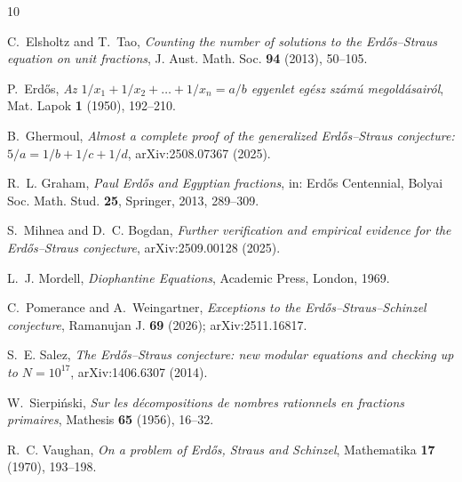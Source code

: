 \documentclass[11pt]{amsart}
\theoremstyle{remark}
\theoremstyle{definition}
\begin{document}
\begin{thebibliography}{10}

C.~Elsholtz and T.~Tao,
\emph{Counting the number of solutions to the Erd\H{o}s--Straus equation
on unit fractions},
J. Aust. Math. Soc. \textbf{94} (2013), 50--105.

P.~Erd\H{o}s,
\emph{Az $1/x_1 + 1/x_2 + \dots + 1/x_n = a/b$ egyenlet eg\'esz sz\'am\'u
megold\'asair\'ol},
Mat. Lapok \textbf{1} (1950), 192--210.

B.~Ghermoul,
\emph{Almost a complete proof of the generalized Erd\H{o}s--Straus
conjecture: $5/a = 1/b + 1/c + 1/d$},
arXiv:2508.07367 (2025).

R.~L. Graham,
\emph{Paul Erd\H{o}s and Egyptian fractions},
in: Erd\H{o}s Centennial, Bolyai Soc. Math. Stud. \textbf{25},
Springer, 2013, 289--309.

S.~Mihnea and D.~C. Bogdan,
\emph{Further verification and empirical evidence for the
Erd\H{o}s--Straus conjecture},
arXiv:2509.00128 (2025).

L.~J. Mordell,
\emph{Diophantine Equations},
Academic Press, London, 1969.

C.~Pomerance and A.~Weingartner,
\emph{Exceptions to the Erd\H{o}s--Straus--Schinzel conjecture},
Ramanujan J. \textbf{69} (2026); arXiv:2511.16817.

S.~E. Salez,
\emph{The Erd\H{o}s--Straus conjecture: new modular equations and
checking up to $N = 10^{17}$},
arXiv:1406.6307 (2014).

W.~Sierpi\'nski,
\emph{Sur les d\'ecompositions de nombres rationnels en fractions
primaires},
Mathesis \textbf{65} (1956), 16--32.

R.~C. Vaughan,
\emph{On a problem of Erd\H{o}s, Straus and Schinzel},
Mathematika \textbf{17} (1970), 193--198.

\end{thebibliography}
\end{document}
